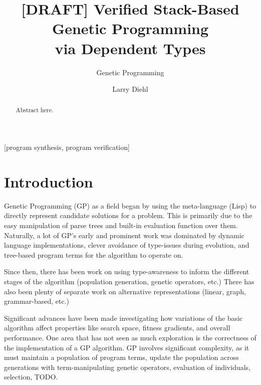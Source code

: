 \documentclass{acm_proc_article-sp}
\begin{document}
\title{[DRAFT] Verified Stack-Based Genetic Programming\\
via Dependent Types}

\subtitle{Genetic Programming}

\author{
\alignauthor Larry Diehl\\
}

\maketitle
\begin{abstract}
Abstract here.
\end{abstract}

[program synthesis, program verification]



\section{Introduction}

Genetic Programming (GP) as a field began by using the meta-language
(Lisp) to directly represent candidate solutions for a problem. This is primarily due
to the easy manipulation of parse trees and built-in evaluation
function over them. Naturally, a lot of GP's early and prominent work
was dominated by dynamic language implementations, clever avoidance of
type-issues during evolution, and tree-based program terms
for the algorithm to operate on.

Since then, there has been work on using type-awareness to inform the
different stages of the algorithm
\cite{montana:strongtree, tchernev:crossmethods}  
(population generation, genetic operators, etc.) There has also been
plenty of separate work on alternative representations (linear, graph,
grammar-based, etc.) 

Significant advances have been made investigating how variations of
the basic algorithm affect properties like search space, fitness
gradients, and overall performance. One area that has not seen as much
exploration is the correctness of the implementation of a GP
algorithm. GP involves significant complexity, as it must maintain a
population of program terms, update the population across generations
with term-manipulating genetic operators, evaluation of individuals,
selection, TODO.
\end{document}
